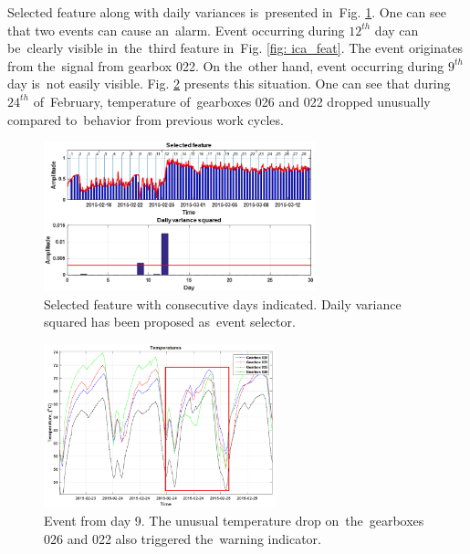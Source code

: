 Selected feature along with daily variances is~presented in~Fig. \ref{fig: ica_feat2}. One can see that two events can cause an~alarm. Event occurring during $12^{th}$ day can be~clearly visible in~the~third feature in~Fig. \ref{fig: ica_feat}. The event originates from the~signal from gearbox 022. On the~other hand, event occurring during $9^{th}$ day is~not easily visible. Fig. \ref{fig: ica_feat3} presents this situation. One can see that during $24^{th}$ of~February, temperature of~gearboxes 026 and 022 dropped unusually compared to~behavior from previous work cycles. 

\begin{figure}[ht!]
\centering
\includegraphics[width = 0.7\textwidth]{wykresy/ica_feat2.png}
\caption{Selected feature with consecutive days indicated. Daily variance squared has been proposed as~event selector.}
\label{fig: ica_feat2}
\end{figure}

\begin{figure}[ht!]
\centering
\includegraphics[width = 0.6\textwidth]{wykresy/ica_feat3.png}
\caption{Event from day 9. The unusual temperature drop on~the~gearboxes 026 and 022 also triggered the~warning indicator.}
\label{fig: ica_feat3}
\end{figure}



